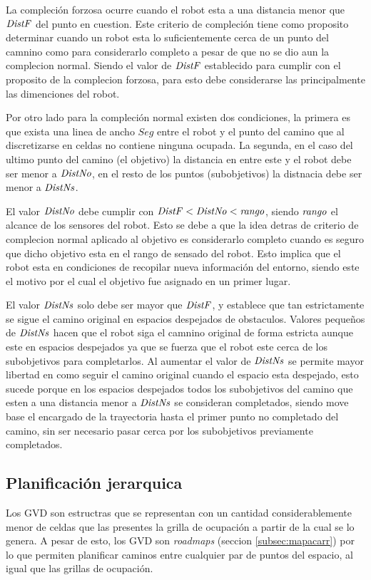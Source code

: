 La compleción forzosa ocurre cuando el robot esta a una distancia menor que
$\mathit{DistF}$ del punto en cuestion. Este criterio de compleción tiene como
proposito determinar cuando un robot esta lo suficientemente cerca de un
punto del camnino como para considerarlo completo a pesar de que no se dio
aun la complecion normal. Siendo el valor de $\mathit{DistF}$ establecido para
cumplir con el proposito de la complecion forzosa, para esto debe considerarse
las principalmente las dimenciones del robot.

Por otro lado para la compleción normal existen dos condiciones, la primera es
que exista una linea de ancho $Seg$ entre el robot y el punto del camino que al
discretizarse en celdas no contiene ninguna ocupada. La segunda, en el caso del
ultimo punto del camino (el objetivo) la distancia en entre este y el robot
debe ser menor a $\mathit{DistNo}$, en el resto de los puntos (subobjetivos) la distnacia debe
ser menor a $\mathit{DistNs}$.

El valor $\mathit{DistNo}$ debe cumplir con
$\mathit{DistF}<\mathit{DistNo}<\mathit{rango}$, siendo $\mathit{rango}$ el alcance de los
sensores del robot. Esto se debe a que la idea detras de criterio de complecion
normal aplicado al objetivo es considerarlo completo cuando es seguro que dicho objetivo
esta en el rango de sensado del robot. Esto implica que el robot esta en
condiciones de recopilar nueva información del entorno, siendo este el motivo
por el cual el objetivo fue asignado en un primer lugar.

El valor $\mathit{DistNs}$ solo debe ser mayor que $\mathit{DistF}$, y establece que
tan estrictamente se sigue el camino original en espacios despejados de
obstaculos. Valores pequeños de $\mathit{DistNs}$ hacen que el robot siga el
camnino original de forma estricta aunque este en espacios despejados ya que se 
fuerza que el robot este cerca de los subobjetivos para completarlos. Al
aumentar el valor de $\mathit{DistNs}$ se permite mayor libertad en como seguir el
camino original cuando el espacio esta despejado, esto sucede porque en los
espacios despejados todos los subobjetivos del camino que esten a una
distancia menor a $\mathit{DistNs}$ se consideran completados, siendo move base el
encargado de la trayectoria hasta el primer punto no completado del camino,
sin ser necesario pasar cerca por los subobjetivos previamente completados.

\subsection{Planificación jerarquica}
Los GVD son estructras que se representan con un cantidad considerablemente
menor de celdas que las presentes la grilla de ocupación a partir de la cual se
lo genera. A pesar de esto, los GVD son \emph{roadmaps} (seccion
\ref{subsec:mapacarr}) por lo que permiten planificar caminos entre cualquier par de
puntos del espacio, al igual que las grillas de ocupación. 

